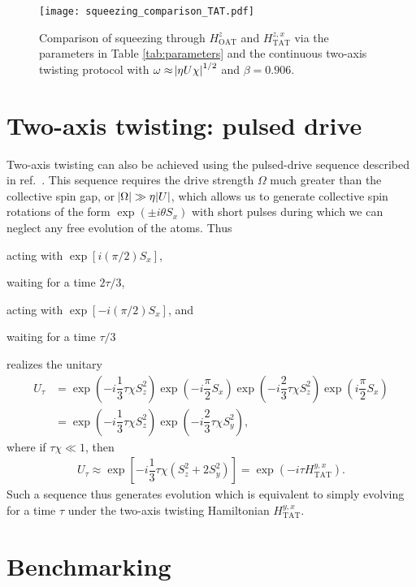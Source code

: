 \documentclass[aps,notitlepage,nofootinbib,11pt]{revtex4-1}
\renewcommand{\t}{\text} %
\newcommand{\f}[2]{\dfrac{#1}{#2}} %
\newcommand{\p}[1]{\left(#1\right)} %
\renewcommand{\sp}[1]{\left[#1\right]} %
\newcommand{\1}{\mathds{1}}
\begin{document}
\begin{figure}
  \centering \texttt{[image: squeezing\_comparison\_TAT.pdf]}
  \caption{Comparison of squeezing through $H_{\t{OAT}}^z$ and
    $H_{\t{TAT}}^{z,x}$ via the parameters in Table
    \ref{tab:parameters} and the continuous two-axis twisting protocol
    with $\omega\approx\abs{\eta U\chi}^{1/2}$ and $\beta=0.906$.}
  \label{fig:squeezing_comparison_TAT}
\end{figure}


\section{Two-axis twisting: pulsed drive}

Two-axis twisting can also be achieved using the pulsed-drive sequence
described in ref.~\cite{liu2011spin}.  This sequence requires the
drive strength $\Omega$ much greater than the collective spin gap, or
$\abs{\Omega}\gg\eta\abs{U}$, which allows us to generate collective
spin rotations of the form $\exp\p{\pm i\theta S_x}$ with short pulses
during which we can neglect any free evolution of the atoms.  Thus
\begin{enumerate*}[label=(\roman*)]
\item acting with $\exp\sp{i\p{\pi/2}S_x}$,
\item waiting for a time $2\tau/3$,
\item acting with $\exp\sp{-i\p{\pi/2}S_x}$, and
\item waiting for a time $\tau/3$
\end{enumerate*}
realizes the unitary
\begin{align}
  U_\tau
  &= \exp\p{-i\f13\tau\chi S_z^2} \exp\p{-i\f{\pi}{2}S_x}
  \exp\p{-i\f23\tau\chi S_z^2} \exp\p{i\f{\pi}{2}S_x} \\
  &= \exp\p{-i\f13\tau\chi S_z^2} \exp\p{-i\f23\tau\chi S_y^2},
\end{align}
where if $\tau\chi\ll1$, then
\begin{align}
  U_\tau \approx \exp\sp{-i\f13\tau\chi\p{S_z^2 + 2S_y^2}}
  = \exp\p{-i\tau H_{\t{TAT}}^{y,x}}.
\end{align}
Such a sequence thus generates evolution which is equivalent to simply
evolving for a time $\tau$ under the two-axis twisting Hamiltonian
$H_{\t{TAT}}^{y,x}$.


\section{Benchmarking}
\end{document}
